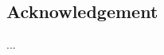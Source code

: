 \vspace*{15em}

\begin{center}
    \section*{Acknowledgement}
    
        ...

\end{center}

{}

\newpage